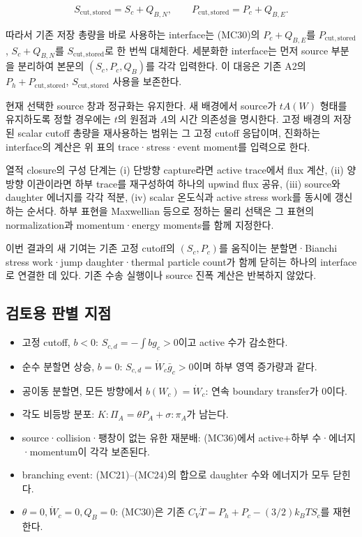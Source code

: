 \[
S_{\mathrm{cut,stored}}=S_c+Q_{B,N},\qquad
P_{\mathrm{cut,stored}}=P_c+Q_{B,E}.
\tag{MC37}
\]

따라서 기존 저장 총량을 바로 사용하는 interface는 (MC30)의 \(P_c+Q_{B,E}\)를 \(P_{\mathrm{cut,stored}}\), \(S_c+Q_{B,N}\)를 \(S_{\mathrm{cut,stored}}\)로 한 번씩 대체한다. 세분화한 interface는 먼저 source 부분을 분리하여 본문의 \((S_c,P_c,Q_B)\)를 각각 입력한다. 이 대응은 기존 A2의 \(P_h+P_{\mathrm{cut,stored}}\), \(S_{\mathrm{cut,stored}}\) 사용을 보존한다.

현재 선택한 source 창과 정규화는 유지한다. 새 배경에서 source가 \(tA(W)\) 형태를 유지하도록 정할 경우에는 \(t\)의 원점과 \(A\)의 시간 의존성을 명시한다. 고정 배경의 저장된 scalar cutoff 총량을 재사용하는 범위는 그 고정 cutoff 응답이며, 진화하는 interface의 계산은 위 표의 trace·stress·event moment를 입력으로 한다.

열적 closure의 구성 단계는 (i) 단방향 capture라면 active trace에서 flux 계산, (ii) 양방향 이관이라면 하부 trace를 재구성하여 하나의 upwind flux 공유, (iii) source와 daughter 에너지를 각각 적분, (iv) scalar 온도식과 active stress work를 동시에 갱신하는 순서다. 하부 표현을 Maxwellian 등으로 정하는 물리 선택은 그 표현의 normalization과 momentum·energy moments를 함께 지정한다.

이번 결과의 새 기여는 기존 고정 cutoff의 \((S_c,P_c)\)를 움직이는 분할면·Bianchi stress work·jump daughter·thermal particle count가 함께 닫히는 하나의 interface로 연결한 데 있다. 기존 수송 실행이나 source 진폭 계산은 반복하지 않았다.

\hypertarget{uxac80uxd1a0uxc6a9-uxd310uxbcc4-uxc9c0uxc810}{%
\subsection{검토용 판별 지점}\label{uxac80uxd1a0uxc6a9-uxd310uxbcc4-uxc9c0uxc810}}

\begin{itemize}
\tightlist
\item
  고정 cutoff, \(b<0\): \(S_{c,d}=-\int bg_c>0\)이고 active 수가 감소한다.
\item
  순수 분할면 상승, \(b=0\): \(S_{c,d}=\dot W_c\bar g_c>0\)이며 하부 영역 증가량과 같다.
\item
  공이동 분할면, 모든 방향에서 \(b(W_c)=\dot W_c\): 연속 boundary transfer가 0이다.
\item
  각도 비등방 분포: \(K:\Pi_A=\theta P_A+\sigma:\pi_A\)가 남는다.
\item
  source·collision·팽창이 없는 유한 재분배: (MC36)에서 active+하부 수·에너지·momentum이 각각 보존된다.
\item
  branching event: (MC21)--(MC24)의 합으로 daughter 수와 에너지가 모두 닫힌다.
\item
  \(\theta=0,\dot W_c=0,Q_B=0\): (MC30)은 기존 \(C_V\dot T=P_h+P_c-(3/2)k_BT S_c\)를 재현한다.
\end{itemize}

